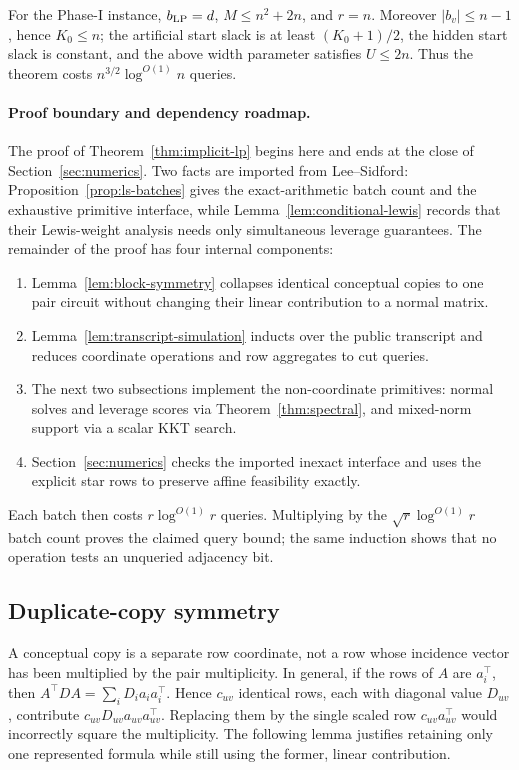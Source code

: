 \documentclass[11pt]{article}
\theoremstyle{definition}
\begin{document}
For the Phase-I instance, $b_{\rm LP}=d$, $M\le n^2+2n$, and $r=n$.  Moreover
$|b_v|\le n-1$, hence $K_0\le n$; the artificial start slack is at least
$(K_0+1)/2$, the hidden start slack is constant, and the above width
parameter satisfies $U\le2n$.  Thus the theorem costs
$n^{3/2}\log^{O(1)}n$ queries.

\paragraph{Proof boundary and dependency roadmap.}
The proof of Theorem~\ref{thm:implicit-lp} begins here and ends at the close of
Section~\ref{sec:numerics}.  Two facts are imported from Lee--Sidford:
Proposition~\ref{prop:ls-batches} gives the exact-arithmetic batch count and
the exhaustive primitive interface, while
Lemma~\ref{lem:conditional-lewis} records that their Lewis-weight analysis
needs only simultaneous leverage guarantees.  The remainder of the proof has
four internal components:
\begin{enumerate}[label=(\arabic*)]
\item Lemma~\ref{lem:block-symmetry} collapses identical conceptual copies to
      one pair circuit without changing their linear contribution to a normal
      matrix.
\item Lemma~\ref{lem:transcript-simulation} inducts over the public transcript
      and reduces coordinate operations and row aggregates to cut queries.
\item The next two subsections implement the non-coordinate primitives:
      normal solves and leverage scores via Theorem~\ref{thm:spectral}, and
      mixed-norm support via a scalar KKT search.
\item Section~\ref{sec:numerics} checks the imported inexact interface and
      uses the explicit star rows to preserve affine feasibility exactly.
\end{enumerate}
Each batch then costs $r\log^{O(1)}r$ queries.  Multiplying by the
$\sqrt r\log^{O(1)}r$ batch count proves the claimed query bound; the same
induction shows that no operation tests an unqueried adjacency bit.

\subsection{Duplicate-copy symmetry}

A conceptual copy is a separate row coordinate, not a row whose incidence
vector has been multiplied by the pair multiplicity.  In general, if the
rows of $A$ are $a_i^\top$, then
$A^\top DA=\sum_iD_i a_i a_i^\top$.  Hence $c_{uv}$ identical rows, each with
diagonal value $D_{uv}$, contribute
$c_{uv}D_{uv}a_{uv}a_{uv}^\top$.  Replacing them by the single scaled row
$c_{uv}a_{uv}^\top$ would incorrectly square the multiplicity.  The following
lemma justifies retaining only one represented formula while still using the
former, linear contribution.
\end{document}
